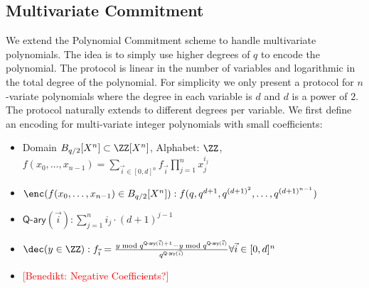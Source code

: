 \documentclass{article}
\newcommand{\benedikt}[1]{{\textcolor{red}{[Benedikt: #1]}}}
\newcommand{\benedikt}[1]{}
\begin{document}
\subsection{Multivariate Commitment}
  We extend the Polynomial Commitment scheme to handle multivariate polynomials. The idea is to simply use higher degrees of $q$ to encode the polynomial. The protocol is linear in the number of variables and logarithmic in the total degree of the polynomial. For simplicity we only present a protocol for $n$-variate polynomials where the degree in each variable is $d$ and $d$ is a power of $2$. The protocol naturally extends to different degrees per variable.
We first define an encoding for multi-variate integer polynomials with small coefficients:
 \begin{itemize}
	\item Domain $B_{q/2}[X^n] \subset \ZZ[X^n]$, Alphabet: $\ZZ$, \\$f(x_0,\dots,x_{n-1})=\sum_{\vec{i} \in [0,d]^n} f_{\vec{i}} \prod_{j=1}^{n} x_j^{i_j}$
	\item $\enc(f(x_0,\dots,x_{n-1}) \in B_{q/2}[X^n]): f(q,q^{d+1},q^{(d+1)^2},\dots,q^{(d+1)^{n-1}})$
	\item $\textsf{Q-ary}(\vec{i}):\sum_{j=1}^{n} i_j\cdot (d+1)^{j-1}$
	\item $\dec(y \in \ZZ): f_{\vec{i}}=\frac{y \bmod q^{\textsf{Q-ary}(\vec{i})+1}-y \bmod q^{\textsf{Q-ary}(\vec{i})}}{q^{\textsf{Q-ary}(\vec{i})}} \forall \vec{i} \in [0,d]^n$
	\item \benedikt{Negative Coefficients?}

\end{itemize}
\end{document}
